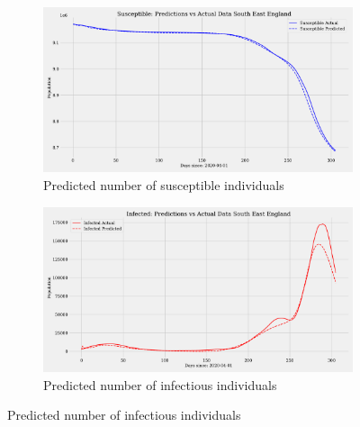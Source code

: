 \documentclass[12pt]{article}
\begin{document}
\begin{figure}
    \centering
    \begin{subfigure}[t]{0.45\textwidth}
        \includegraphics[width=\textwidth]{images/pinn/S_predictions_South East England.pdf}
        \caption{Predicted number of susceptible individuals}
        \label{fig:S_predictions_South East England}
    \end{subfigure}
    \hfill %
    \begin{subfigure}[t]{0.45\textwidth}
        \includegraphics[width=\textwidth]{images/pinn/I_predictions_South East England.pdf}
        \caption{Predicted number of infectious individuals}
        \label{fig:I_predictions_South East England}
    \end{subfigure}

    \vspace{0.5cm}


\end{figure}
\end{document}
